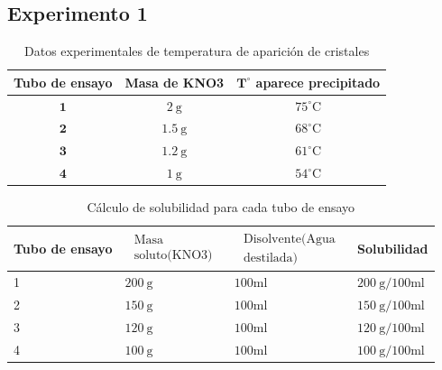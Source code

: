\documentclass[11pt]{scrartcl}
\begin{document}
\subsection*{Experimento 1}


\begin{table}[H]
	\caption{ Datos experimentales de temperatura de aparición de cristales}
\begin{center}
\begin{tabular}{|c|c|c|}
\hline
Tubo de ensayo & Masa de KNO3 & $\mathbf{T}^{\circ}$ aparece precipitado \\
\hline
$\mathbf{1}$ & $2 \mathrm{~g}$ & $75^{\circ} \mathrm{C}$ \\
\hline
$\mathbf{2}$ & $1.5 \mathrm{~g}$ & $68^{\circ} \mathrm{C}$ \\
\hline
$\mathbf{3}$ & $1.2 \mathrm{~g}$ & $61^{\circ} \mathrm{C}$ \\
\hline
$\mathbf{4}$ & $1 \mathrm{~g}$ & $54^{\circ} \mathrm{C}$ \\
\hline
\end{tabular}
\end{center}
\end{table}

\begin{table}[H]
	\caption{ Cálculo de solubilidad para cada tubo de ensayo}
\begin{center}
\begin{tabular}{|l|l|l|l|}
\hline
Tubo de ensayo & $\begin{array}{l}\text { Masa } \\ \text { soluto(KNO3) }\end{array}$ & $\begin{array}{l}\text { Disolvente(Agua } \\ \text { destilada) }\end{array}$ & Solubilidad \\
\hline
1 & $200 \mathrm{~g}$ & $100 \mathrm{ml}$ & $200 \mathrm{~g} / 100 \mathrm{ml}$ \\
\hline
2 & $150 \mathrm{~g}$ & $100 \mathrm{ml}$ & $150 \mathrm{~g} / 100 \mathrm{ml}$ \\
\hline
3 & $120 \mathrm{~g}$ & $100 \mathrm{ml}$ & $120 \mathrm{~g} / 100 \mathrm{ml}$ \\
\hline
4 & $100 \mathrm{~g}$ & $100 \mathrm{ml}$ & $100 \mathrm{~g} / 100 \mathrm{ml}$ \\
\hline
\end{tabular}
\end{center}
\end{table}
\end{document}
